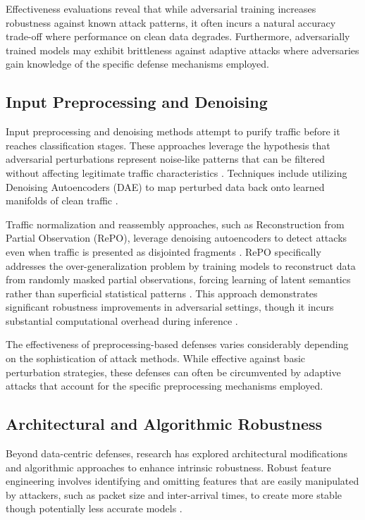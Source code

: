 Effectiveness evaluations reveal that while adversarial training increases robustness against known attack patterns, it often incurs a natural accuracy trade-off where performance on clean data degrades. Furthermore, adversarially trained models may exhibit brittleness against adaptive attacks where adversaries gain knowledge of the specific defense mechanisms employed.

\subsection{Input Preprocessing and Denoising}

Input preprocessing and denoising methods attempt to purify traffic before it reaches classification stages. These approaches leverage the hypothesis that adversarial perturbations represent noise-like patterns that can be filtered without affecting legitimate traffic characteristics \cite{combatting2023adversarial}. Techniques include utilizing Denoising Autoencoders (DAE) to map perturbed data back onto learned manifolds of clean traffic \cite{combatting2023adversarial}.

Traffic normalization and reassembly approaches, such as Reconstruction from Partial Observation (RePO), leverage denoising autoencoders to detect attacks even when traffic is presented as disjointed fragments \cite{enhancing2023robustness}. RePO specifically addresses the over-generalization problem by training models to reconstruct data from randomly masked partial observations, forcing learning of latent semantics rather than superficial statistical patterns \cite{hashemi2020enhancing}. This approach demonstrates significant robustness improvements in adversarial settings, though it incurs substantial computational overhead during inference \cite{hashemi2020enhancing}.

The effectiveness of preprocessing-based defenses varies considerably depending on the sophistication of attack methods. While effective against basic perturbation strategies, these defenses can often be circumvented by adaptive attacks that account for the specific preprocessing mechanisms employed.

\subsection{Architectural and Algorithmic Robustness}

Beyond data-centric defenses, research has explored architectural modifications and algorithmic approaches to enhance intrinsic robustness. Robust feature engineering involves identifying and omitting features that are easily manipulated by attackers, such as packet size and inter-arrival times, to create more stable though potentially less accurate models \cite{explainability2023adversarial}.

